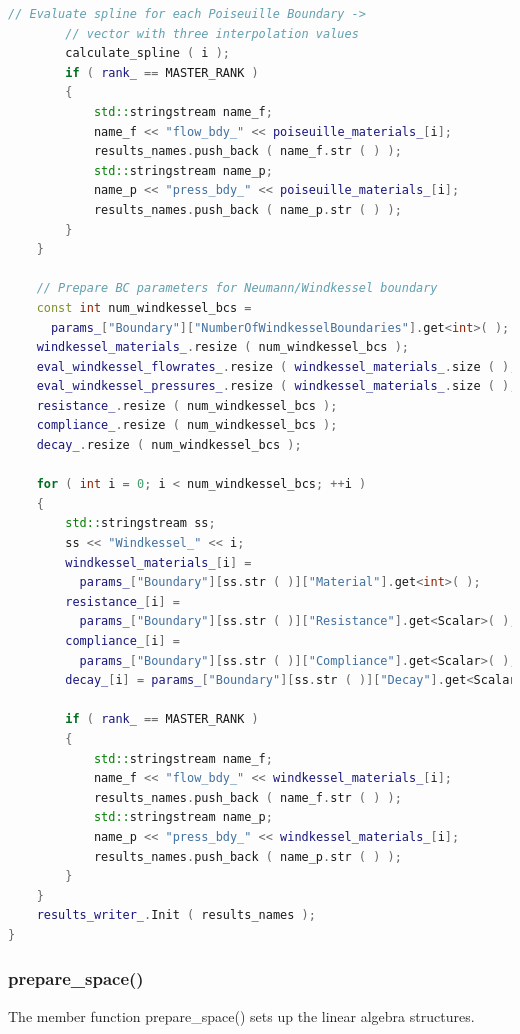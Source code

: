 \documentclass[a4paper, 11pt, twoside]{article}
\begin{document}
\begin{lstlisting}[language=C++, basicstyle={\footnotesize, \ttfamily}, keywordstyle=\color{blue},  numbers=none, tabsize=4]
        // Evaluate spline for each Poiseuille Boundary ->
        // vector with three interpolation values
        calculate_spline ( i );
        if ( rank_ == MASTER_RANK )
        {
            std::stringstream name_f;
            name_f << "flow_bdy_" << poiseuille_materials_[i];
            results_names.push_back ( name_f.str ( ) );
            std::stringstream name_p;
            name_p << "press_bdy_" << poiseuille_materials_[i];
            results_names.push_back ( name_p.str ( ) );
        }
    }

    // Prepare BC parameters for Neumann/Windkessel boundary
    const int num_windkessel_bcs = 
      params_["Boundary"]["NumberOfWindkesselBoundaries"].get<int>( );
    windkessel_materials_.resize ( num_windkessel_bcs );
    eval_windkessel_flowrates_.resize ( windkessel_materials_.size ( ), 0 );
    eval_windkessel_pressures_.resize ( windkessel_materials_.size ( ), 0 );
    resistance_.resize ( num_windkessel_bcs );
    compliance_.resize ( num_windkessel_bcs );
    decay_.resize ( num_windkessel_bcs );

    for ( int i = 0; i < num_windkessel_bcs; ++i )
    {
        std::stringstream ss;
        ss << "Windkessel_" << i;
        windkessel_materials_[i] =
          params_["Boundary"][ss.str ( )]["Material"].get<int>( );
        resistance_[i] =
          params_["Boundary"][ss.str ( )]["Resistance"].get<Scalar>( );
        compliance_[i] =
          params_["Boundary"][ss.str ( )]["Compliance"].get<Scalar>( );
        decay_[i] = params_["Boundary"][ss.str ( )]["Decay"].get<Scalar>( );

        if ( rank_ == MASTER_RANK )
        {
            std::stringstream name_f;
            name_f << "flow_bdy_" << windkessel_materials_[i];
            results_names.push_back ( name_f.str ( ) );
            std::stringstream name_p;
            name_p << "press_bdy_" << windkessel_materials_[i];
            results_names.push_back ( name_p.str ( ) );
        }
    }
    results_writer_.Init ( results_names );
}
\end{lstlisting}

\subsubsection{prepare\_space()}
The member function prepare\_space() sets up the linear algebra structures.
\end{document}
